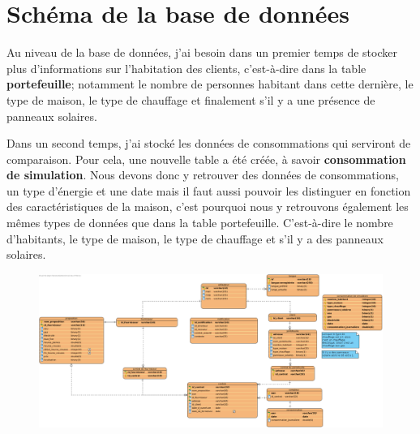\section{Schéma de la base de données}

\begin{flushleft}
Au niveau de la base de données, j'ai besoin dans un premier temps de stocker plus d'informations sur l'habitation des clients, c'est-à-dire dans la table \textbf{portefeuille}; notamment le nombre de personnes habitant dans cette dernière, le type de maison, le type de chauffage et finalement s'il y a une présence de panneaux solaires.
\end{flushleft}

\begin{flushleft}
Dans un second temps, j'ai stocké les données de consommations qui serviront de comparaison. Pour cela, une nouvelle table a été créée, à savoir \textbf{consommation de simulation}. Nous devons donc y retrouver des données de consommations, un type d'énergie et une date mais il faut aussi pouvoir les distinguer en fonction des caractéristiques de la maison, c'est pourquoi nous y retrouvons également les mêmes types de données que dans la table portefeuille. C'est-à-dire le nombre d'habitants, le type de maison, le type de chauffage et s'il y a des panneaux solaires.
\end{flushleft}

\begin{figure}[h]
\centering
\includegraphics[width=1.3\textwidth]{extension-adrien/Bdd/img/bdd.png}
\end{figure}

